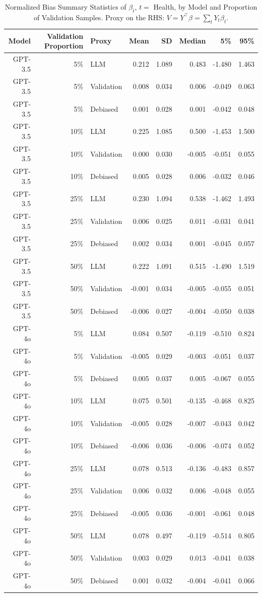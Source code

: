 \begin{table}

\caption{Normalized Bias Summary Statistics of $\beta_{t}$, $t=$ Health, by Model and Proportion of Validation Samples. Proxy on the RHS: $V = Y^\top \beta = \sum_{t} Y_t \beta_t$.}
\centering
\begin{tabular}[t]{rrlrrrrr}
\toprule
Model & Validation Proportion & Proxy & Mean & SD & Median & 5\% & 95\%\\
\midrule
GPT-3.5 & 5\% & LLM & 0.212 & 1.089 & 0.483 & -1.480 & 1.463\\
GPT-3.5 & 5\% & Validation & 0.008 & 0.034 & 0.006 & -0.049 & 0.063\\
GPT-3.5 & 5\% & Debiased & 0.001 & 0.028 & 0.001 & -0.042 & 0.048\\
GPT-3.5 & 10\% & LLM & 0.225 & 1.085 & 0.500 & -1.453 & 1.500\\
GPT-3.5 & 10\% & Validation & 0.000 & 0.030 & -0.005 & -0.051 & 0.055\\
GPT-3.5 & 10\% & Debiased & 0.005 & 0.028 & 0.006 & -0.032 & 0.046\\
GPT-3.5 & 25\% & LLM & 0.230 & 1.094 & 0.538 & -1.462 & 1.493\\
GPT-3.5 & 25\% & Validation & 0.006 & 0.025 & 0.011 & -0.031 & 0.041\\
GPT-3.5 & 25\% & Debiased & 0.002 & 0.034 & 0.001 & -0.045 & 0.057\\
GPT-3.5 & 50\% & LLM & 0.222 & 1.091 & 0.515 & -1.490 & 1.519\\
GPT-3.5 & 50\% & Validation & -0.001 & 0.034 & -0.005 & -0.055 & 0.051\\
GPT-3.5 & 50\% & Debiased & -0.006 & 0.027 & -0.004 & -0.050 & 0.038\\
GPT-4o & 5\% & LLM & 0.084 & 0.507 & -0.119 & -0.510 & 0.824\\
GPT-4o & 5\% & Validation & -0.005 & 0.029 & -0.003 & -0.051 & 0.037\\
GPT-4o & 5\% & Debiased & 0.005 & 0.037 & 0.005 & -0.067 & 0.055\\
GPT-4o & 10\% & LLM & 0.075 & 0.501 & -0.135 & -0.468 & 0.825\\
GPT-4o & 10\% & Validation & -0.005 & 0.028 & -0.007 & -0.043 & 0.042\\
GPT-4o & 10\% & Debiased & -0.006 & 0.036 & -0.006 & -0.074 & 0.052\\
GPT-4o & 25\% & LLM & 0.078 & 0.513 & -0.136 & -0.483 & 0.857\\
GPT-4o & 25\% & Validation & 0.006 & 0.032 & 0.006 & -0.048 & 0.055\\
GPT-4o & 25\% & Debiased & -0.005 & 0.036 & -0.001 & -0.061 & 0.048\\
GPT-4o & 50\% & LLM & 0.078 & 0.497 & -0.119 & -0.514 & 0.805\\
GPT-4o & 50\% & Validation & 0.003 & 0.029 & 0.013 & -0.041 & 0.038\\
GPT-4o & 50\% & Debiased & 0.001 & 0.032 & -0.004 & -0.041 & 0.066\\
\bottomrule
\end{tabular}
\end{table}
